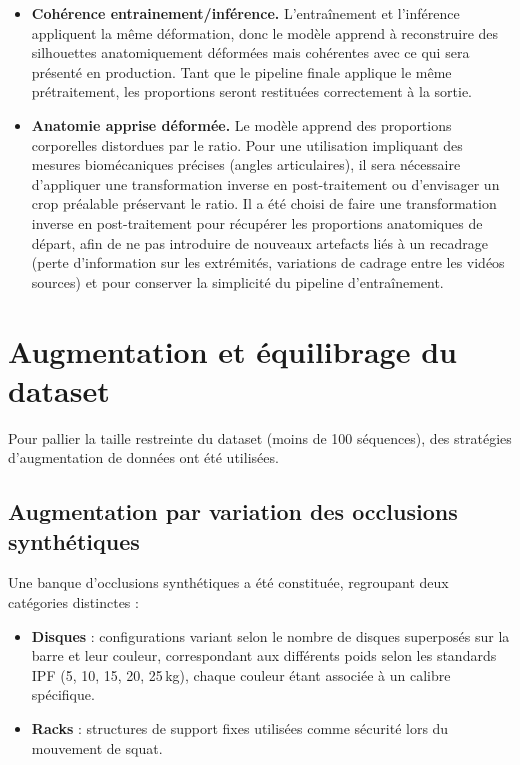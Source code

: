 \begin{itemize}
  \item \textbf{Cohérence entrainement/inférence.} L'entraînement et l'inférence appliquent la même déformation, donc le modèle apprend à reconstruire des silhouettes anatomiquement déformées mais cohérentes avec ce qui sera présenté en production. Tant que le pipeline finale applique le même prétraitement, les proportions seront restituées correctement à la sortie.
  \item \textbf{Anatomie apprise déformée.} Le modèle apprend des proportions corporelles distordues par le ratio. Pour une utilisation impliquant des mesures biomécaniques précises (angles articulaires), il sera nécessaire d'appliquer une transformation inverse en post-traitement ou d'envisager un crop préalable préservant le ratio. Il a été choisi de faire une transformation inverse en post-traitement pour récupérer les proportions anatomiques de départ, afin de ne pas introduire de nouveaux artefacts liés à un recadrage (perte d'information sur les extrémités, variations de cadrage entre les vidéos sources) et pour conserver la simplicité du pipeline d'entraînement.
\end{itemize}

\section{Augmentation et équilibrage du dataset}

Pour pallier la taille restreinte du dataset (moins de 100 séquences), des stratégies d'augmentation de données ont été utilisées.

\subsection{Augmentation par variation des occlusions synthétiques}

Une banque d'occlusions synthétiques a été constituée, regroupant deux catégories distinctes :
\begin{itemize}
  \item \textbf{Disques} : configurations variant selon le nombre de disques superposés sur la barre et leur couleur, correspondant aux différents poids selon les standards IPF (5, 10, 15, 20, 25\,kg), chaque couleur étant associée à un calibre spécifique.
  \item \textbf{Racks} : structures de support fixes utilisées comme sécurité lors du mouvement de squat.
\end{itemize}

